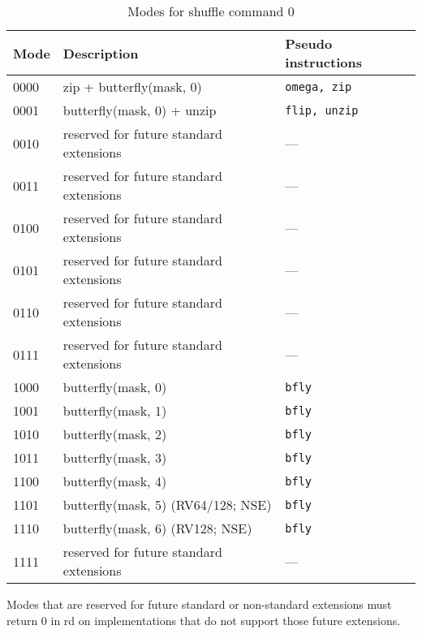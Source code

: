 \begin{table}[h]
\begin{small}
\begin{center}
\begin{tabular}{l l l}
Mode & Description & Pseudo instructions \\ \hline

0000 & zip + butterfly(mask, 0)                    & {\tt omega, zip} \\
0001 & butterfly(mask, 0) + unzip                  & {\tt flip, unzip} \\
0010 & reserved for future standard extensions     & --- \\
0011 & reserved for future standard extensions     & --- \\
0100 & reserved for future standard extensions     & --- \\
0101 & reserved for future standard extensions     & --- \\
0110 & reserved for future standard extensions     & --- \\
0111 & reserved for future standard extensions     & --- \\

\hline

1000 & butterfly(mask, 0)                          & {\tt bfly} \\
1001 & butterfly(mask, 1)                          & {\tt bfly} \\
1010 & butterfly(mask, 2)                          & {\tt bfly} \\
1011 & butterfly(mask, 3)                          & {\tt bfly} \\
1100 & butterfly(mask, 4)                          & {\tt bfly} \\
1101 & butterfly(mask, 5) (RV64/128; NSE)          & {\tt bfly} \\
1110 & butterfly(mask, 6) (RV128; NSE)             & {\tt bfly} \\
1111 & reserved for future standard extensions     & --- \\

\end{tabular}
\end{center}
\end{small}
\caption{Modes for shuffle command 0}
\label{shuffle-modes}
\end{table}

Modes that are reserved for future standard or non-standard extensions must return
0 in rd on implementations that do not support those future extensions.

